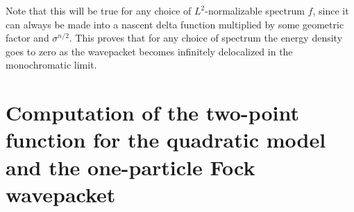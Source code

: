 \documentclass[prd,twocolumn,superscriptaddress,nofootinbib,floatfix,amsmath,amssymb]{revtex4-2}
\begin{document}
    Note that this will be true for any choice of $L^2$-normalizable spectrum $f$, since it can always be made into a nascent delta function multiplied by some geometric factor and $\sigma^{n/2}$. This proves that for any choice of spectrum the energy density goes to zero as the wavepacket becomes infinitely delocalized in the monochromatic limit.
    
    

    
    
    
    
    
    
    

    



    
    \section{Computation of the two-point function for the quadratic model and the one-particle Fock wavepacket}
    \label{appendix: Wightman-quad-oneparticle-proof}
\end{document}
